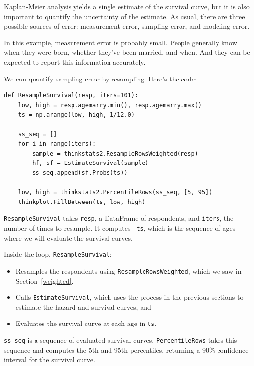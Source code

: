 \documentclass[12pt]{book}
\theoremstyle{exercise}
\begin{document}
Kaplan-Meier analysis yields a single estimate of the survival curve,
but it is also important to quantify the uncertainty of the estimate.
As usual, there are three possible sources of error: measurement
error, sampling error, and modeling error.%
%
%

In this example, measurement error is probably small.  People
generally know when they were born, whether they've been married, and
when.  And they can be expected to report this information accurately.%

We can quantify sampling error by resampling.  Here's the code:%

\begin{verbatim}
def ResampleSurvival(resp, iters=101):
    low, high = resp.agemarry.min(), resp.agemarry.max()
    ts = np.arange(low, high, 1/12.0)

    ss_seq = []
    for i in range(iters):
        sample = thinkstats2.ResampleRowsWeighted(resp)
        hf, sf = EstimateSurvival(sample)
        ss_seq.append(sf.Probs(ts))

    low, high = thinkstats2.PercentileRows(ss_seq, [5, 95])
    thinkplot.FillBetween(ts, low, high)
\end{verbatim}

{\tt ResampleSurvival} takes {\tt resp}, a DataFrame of respondents,
and {\tt iters}, the number of times to resample.  It computes {\tt
  ts}, which is the sequence of ages where we will evaluate the survival
curves.%

Inside the loop, {\tt ResampleSurvival}:

\begin{itemize}

\item Resamples the respondents using {\tt ResampleRowsWeighted},
which we saw in Section~\ref{weighted}.%

\item Calls {\tt EstimateSurvival}, which uses the process in the
previous sections to estimate the hazard and survival curves, and

\item Evaluates the survival curve at each age in {\tt ts}.

\end{itemize}

\verb"ss_seq" is a sequence of evaluated survival curves.
{\tt PercentileRows} takes this sequence and computes the 5th and 95th
percentiles, returning a 90\% confidence interval for the survival
curve.%
\end{document}
